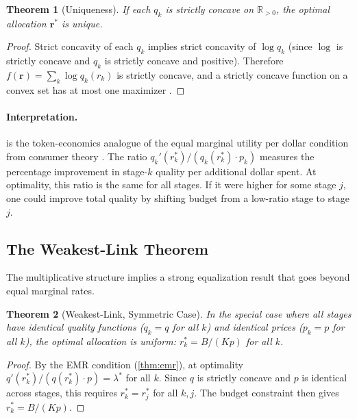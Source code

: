 \documentclass[11pt, a4paper, logo, copyright]{googledeepmind}
\newtheorem{theorem}{Theorem}[section]
\begin{document}
\begin{theorem}[Uniqueness]\label{thm:uniqueness}
If each $q_k$ is strictly concave on $\mathbb{R}_{>0}$, the optimal allocation $\mathbf{r}^*$ is unique.
\end{theorem}

\begin{proof}
Strict concavity of each $q_k$ implies strict concavity of $\log q_k$ (since $\log$ is strictly concave and $q_k$ is strictly concave and positive). Therefore $f(\mathbf{r}) = \sum_k \log q_k(r_k)$ is strictly concave, and a strictly concave function on a convex set has at most one maximizer \citep{rockafellar1970}.
\end{proof}

\paragraph{Interpretation.}
 is the token-economics analogue of the equal marginal utility per dollar condition from consumer theory \citep{mas-colell1995}. The ratio $q_k'(r_k^*) / (q_k(r_k^*) \cdot p_k)$ measures the percentage improvement in stage-$k$ quality per additional dollar spent. At optimality, this ratio is the same for all stages. If it were higher for some stage $j$, one could improve total quality by shifting budget from a low-ratio stage to stage $j$.

\subsection{The Weakest-Link Theorem}

The multiplicative structure implies a strong equalization result that goes beyond equal marginal rates.

\begin{theorem}[Weakest-Link, Symmetric Case]\label{thm:weakest-link}
In the special case where all stages have identical quality functions ($q_k = q$ for all $k$) and identical prices ($p_k = p$ for all $k$), the optimal allocation is uniform: $r_k^* = B / (Kp)$ for all $k$.
\end{theorem}

\begin{proof}
By the EMR condition (\cref{thm:emr}), at optimality $q'(r_k^*) / (q(r_k^*) \cdot p) = \lambda^*$ for all $k$. Since $q$ is strictly concave and $p$ is identical across stages, this requires $r_k^* = r_j^*$ for all $k, j$. The budget constraint then gives $r_k^* = B/(Kp)$.
\end{proof}
\end{document}
